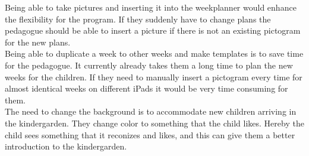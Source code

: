 Being able to take pictures and inserting it into the weekplanner would enhance the flexibility for the program.
If they suddenly have to change plans the pedagogue should be able to insert a picture if there is not an existing pictogram for the new plans.
\\
Being able to duplicate a week to other weeks and make templates is to save time for the pedagogue. 
It currently already takes them a long time to plan the new weeks for the children. 
If they need to manually insert a pictogram every time for almost identical weeks on different iPads it would be very time consuming for them.
\\
The need to change the background is to accommodate new children arriving in the kindergarden. 
They change color to something that the child likes. 
Hereby the child sees something that it reconizes and likes, and this can give them a better introduction to the kindergarden.
